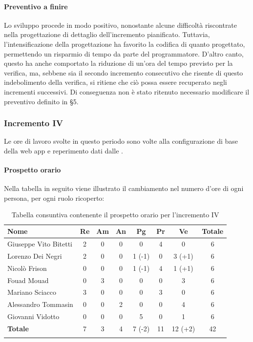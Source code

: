 		\paragraph{Preventivo a finire}
			Lo sviluppo procede in modo positivo, nonostante alcune difficoltà riscontrate nella progettazione di dettaglio dell'incremento pianificato. Tuttavia, l'intensificazione della progettazione ha favorito la codifica di quanto progettato, permettendo un risparmio di tempo da parte del programmatore.
			\newline
			D'altro canto, questo ha anche comportato la riduzione di un'ora del tempo previsto per la verifica, ma, sebbene sia il secondo incremento consecutivo che risente di questo indebolimento della verifica, si ritiene che ciò possa essere recuperato negli incrementi successivi.
			\newline
			Di conseguenza non è stato ritenuto necessario modificare il preventivo definito in \S5.
				
		
		\subsubsection{Incremento IV}
		Le ore di lavoro svolte in questo periodo sono volte alla configurazione di base della web app e reperimento dati dalle .
		\paragraph{Prospetto orario}
			Nella tabella in seguito viene illustrato il cambiamento nel numero d'ore di ogni persona, per ogni ruolo ricoperto:
			
			\begin{longtable}{|l|c|c|c|c|c|c|c|}
				\hline
				\rowcolor{lighter-grayer}
				\textbf{Nome} & \textbf{Re} & \textbf{Am} & \textbf{An} & \textbf{Pg}  & \textbf{Pr}   & \textbf{Ve} & \textbf{Totale} \\
				\hline
				\endfirsthead
				\hline
				Giuseppe Vito Bitetti & 2 & 0 & 0 & 0 & 4 & 0 & 6\\
				\hline
				\hline
				Lorenzo Dei Negri & 2 & 0 & 0 & 1 (-1) & 0 & 3 (+1) & 6\\
				\hline
				\hline
				Nicolò Frison & 0 & 0 & 0 & 1 (-1) & 4 & 1 (+1) & 6\\
				\hline
				\hline
				Fouad Mouad & 0 & 3 & 0 & 0 & 0 & 3 & 6\\
				\hline
				\hline
				Mariano Sciacco & 3 & 0 & 0 & 0 & 3 & 0 & 6\\
				\hline
				\hline
				Alessandro Tommasin & 0 & 0 & 2 & 0 & 0 & 4 & 6\\
				\hline
				\hline
				Giovanni Vidotto & 0 & 0 & 0 & 5 & 0 & 1 & 6\\
				\hline 
				\textbf{Totale} & 7 &  3 & 4 & 7 (-2) & 11  & 12 (+2) & 42 \\
				\hline 
				
				\caption{Tabella consuntiva contenente il prospetto orario per l'incremento IV}
			\end{longtable}
			
